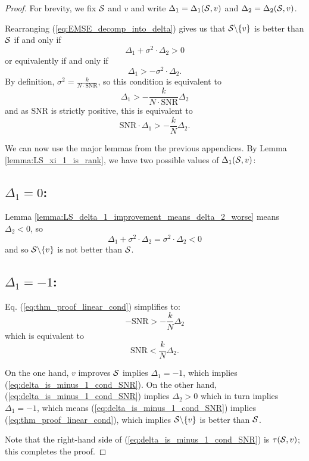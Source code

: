 \begin{proof}
For brevity, we fix $\mathcal{S}$ and $v$ and write $\Delta_{1} = \Delta_{1}(\mathcal{S},v)$ and $\Delta_{2} = \Delta_{2}(\mathcal{S},v) $.


Rearranging (\ref{eq:EMSE_decomp_into_delta}) gives us that $\mathcal{S} \backslash \{v\}$ is better than $\mathcal{S}$ if and only if 
\begin{equation}
    \Delta_{1} + \sigma^{2} \cdot \Delta_{2} > 0
\end{equation}
or equivalently if and only if 
\begin{equation}
    \Delta_{1} > - \sigma^{2} \cdot \Delta_{2} .
\end{equation}
By definition, $\sigma^{2} = \frac{k}{N \cdot \text{SNR}}$, so this condition is equivalent to
\begin{equation}
    \Delta_{1} > - \frac{k}{N \cdot \text{SNR}} \Delta_{2}
\end{equation}
and as SNR is strictly positive, this is equivalent to
\begin{equation}
    \text{SNR}\cdot \Delta_{1} > - \frac{k}{N} \Delta_{2}. \label{eq:thm_proof_linear_cond}
\end{equation}

We can now use the major lemmas from the previous appendices. By Lemma \ref{lemma:LS_xi_1_is_rank}, we have two possible values of $\Delta_{1}(\mathcal{S},v)$:
\subsection*{$\Delta_{1} = 0$:}
Lemma \ref{lemma:LS_delta_1_improvement_means_delta_2_worse} means $\Delta_{2} < 0$, so
\begin{equation}
    \Delta_{1} + \sigma^{2} \cdot \Delta_{2} = \sigma^{2} \cdot \Delta_{2} < 0
\end{equation}
and so $\mathcal{S} \backslash \{v\}$ is not better than $\mathcal{S}$.

\subsection*{$\Delta_{1} = -1$:}
Eq. (\ref{eq:thm_proof_linear_cond}) simplifies to:
\begin{equation}
    - \text{SNR} > - \frac{k}{N} \Delta_{2}
\end{equation}
which is equivalent to
\begin{equation}
    \text{SNR} < \frac{k}{N} \Delta_{2}. \label{eq:delta_is_minus_1_cond_SNR}
\end{equation}

On the one hand, $v$ improves $\mathcal{S}$ implies $\Delta_{1} = -1$, which implies (\ref{eq:delta_is_minus_1_cond_SNR}). On the other hand, (\ref{eq:delta_is_minus_1_cond_SNR}) implies $\Delta_{2} > 0$ which in turn implies $\Delta_{1}=-1$, which means (\ref{eq:delta_is_minus_1_cond_SNR}) implies (\ref{eq:thm_proof_linear_cond}), which implies $\mathcal{S} \backslash \{v\}$ is better than $\mathcal{S}$. 

Note that the right-hand side of (\ref{eq:delta_is_minus_1_cond_SNR}) is $\tau(\mathcal{S},v)$; this completes the proof.
\end{proof}

